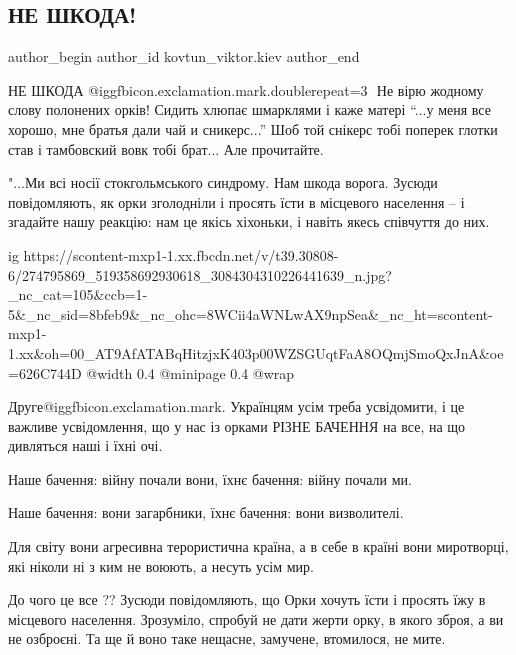  
 
 
 
 
 
\subsection{НЕ ШКОДА!}
\label{sec:07_03_2022.fb.kovtun_viktor.kiev.1.ne_shkoda}
 
\ifcmt
 author_begin
   author_id kovtun_viktor.kiev
 author_end
\fi

НЕ ШКОДА @igg{fbicon.exclamation.mark.double}{repeat=3} ️  Не вірю жодному слову полонених орків! Сидить хлюпає шмарклями і
каже матері \enquote{...у меня все хорошо, мне братья дали чай и сникерс...} Шоб той
снікерс тобі поперек глотки став і тамбовский вовк тобі брат... Але прочитайте.

"...Ми всі носії стокгольмського синдрому. Нам шкода ворога. Зусюди
повідомляють, як орки зголодніли і просять їсти  в місцевого населення – і
згадайте нашу реакцію: нам це якісь хіхоньки, і навіть якесь співчуття до них.  

\ifcmt
  ig https://scontent-mxp1-1.xx.fbcdn.net/v/t39.30808-6/274795869_519358692930618_3084304310226441639_n.jpg?_nc_cat=105&ccb=1-5&_nc_sid=8bfeb9&_nc_ohc=8WCii4aWNLwAX9npSea&_nc_ht=scontent-mxp1-1.xx&oh=00_AT9AfATABqHitzjxK403p00WZSGUqtFaA8OQmjSmoQxJnA&oe=626C744D
  @width 0.4
  @minipage 0.4
  @wrap \parpic[r]
\fi

Друге@igg{fbicon.exclamation.mark}. Українцям усім треба усвідомити, і це
важливе усвідомлення, що у нас із орками РІЗНЕ БАЧЕННЯ на все, на що дивляться
наші і їхні очі. 

Наше бачення: війну почали вони, їхнє бачення: війну почали ми.

Наше бачення: вони загарбники,  їхнє бачення: вони визволителі.

Для світу вони агресивна терористична країна, а в себе в країні вони
миротворці, які ніколи ні з ким не воюють, а несуть усім мир. 

До чого це все ?? Зусюди повідомляють, що Орки хочуть їсти і просять їжу в
місцевого населення. Зрозуміло, спробуй не дати жерти орку, в якого зброя, а ви
не озброєні. Та ще й воно таке нещасне, замучене, втомилося, не мите.

